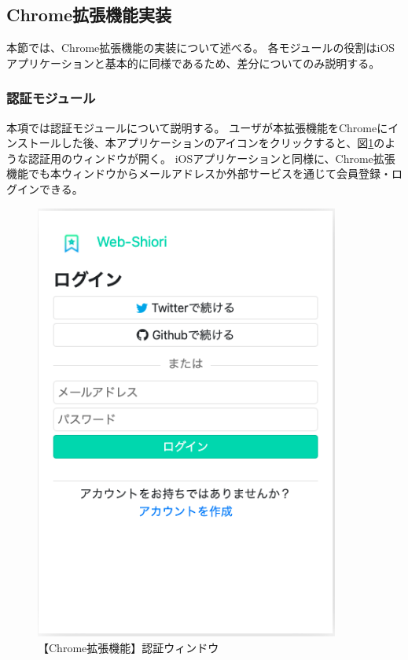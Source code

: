 
\subsection{Chrome拡張機能実装}
本節では、Chrome拡張機能の実装について述べる。
各モジュールの役割はiOSアプリケーションと基本的に同様であるため、差分についてのみ説明する。

\subsubsection{認証モジュール}
本項では認証モジュールについて説明する。
ユーザが本拡張機能をChromeにインストールした後、本アプリケーションのアイコンをクリックすると、図\ref{fig:impl-chrome-auth-view}のような認証用のウィンドウが開く。
iOSアプリケーションと同様に、Chrome拡張機能でも本ウィンドウからメールアドレスか外部サービスを通じて会員登録・ログインできる。

\begin{figure}[htbp]
  \caption{【Chrome拡張機能】認証ウィンドウ}
  \label{fig:impl-chrome-auth-view}
  \begin{center}
    \includegraphics[bb=0 0 404 582,width=10cm]{img/050_implementation/chrome/impl-chrome-auth-view.pdf}
  \end{center}
\end{figure}

